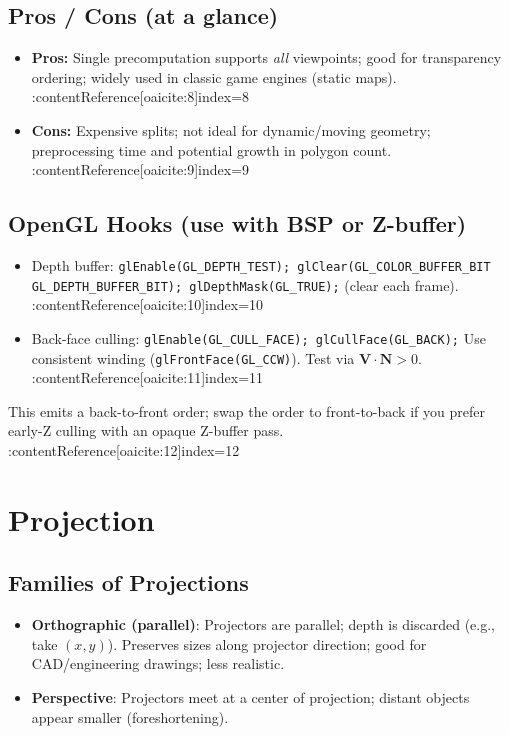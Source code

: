 \documentclass[10pt,twocolumn]{extarticle}
\begin{document}
\subsection*{Pros / Cons (at a glance)}
\begin{itemize}
  \item \textbf{Pros:} Single precomputation supports \emph{all} viewpoints; good for transparency ordering; widely used in classic game engines (static maps). :contentReference[oaicite:8]{index=8}
  \item \textbf{Cons:} Expensive splits; not ideal for dynamic/moving geometry; preprocessing time and potential growth in polygon count. :contentReference[oaicite:9]{index=9}
\end{itemize}

\subsection*{OpenGL Hooks (use with BSP or Z-buffer)}
\begin{itemize}
  \item Depth buffer: \verb|glEnable(GL_DEPTH_TEST); glClear(GL_COLOR_BUFFER_BIT| \verb| GL_DEPTH_BUFFER_BIT); glDepthMask(GL_TRUE);| (clear each frame). :contentReference[oaicite:10]{index=10}
  \item Back-face culling: \verb|glEnable(GL_CULL_FACE); glCullFace(GL_BACK);| Use consistent winding (\verb|glFrontFace(GL_CCW)|). Test via $\mathbf{V}\cdot\mathbf{N}>0$. :contentReference[oaicite:11]{index=11}
\end{itemize}

This emits a back-to-front order; swap the order to front-to-back if you prefer early-Z culling with an opaque Z-buffer pass. :contentReference[oaicite:12]{index=12}


\section{Projection}

\subsection*{Families of Projections}
\begin{itemize}
  \item \textbf{Orthographic (parallel)}: Projectors are parallel; depth is discarded (e.g., take \((x,y)\)). Preserves sizes along projector direction; good for CAD/engineering drawings; less realistic.
  \item \textbf{Perspective}: Projectors meet at a center of projection; distant objects appear smaller (foreshortening).
\end{itemize}
\end{document}
